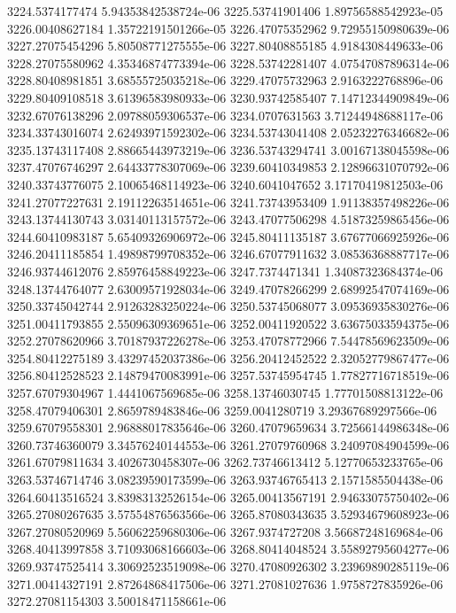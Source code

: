 {3224.5374177474 5.94353842538724e-06
3225.53741901406 1.89756588542923e-05
3226.00408627184 1.35722191501266e-05
3226.47075352962 9.72955150980639e-06
3227.27075454296 5.80508771275555e-06
3227.80408855185 4.9184308449633e-06
3228.27075580962 4.35346874773394e-06
3228.53742281407 4.07547087896314e-06
3228.80408981851 3.68555725035218e-06
3229.47075732963 2.9163222768896e-06
3229.80409108518 3.61396583980933e-06
3230.93742585407 7.14712344909849e-06
3232.67076138296 2.09788059306537e-06
3234.0707631563 3.71244948688117e-06
3234.33743016074 2.62493971592302e-06
3234.53743041408 2.05232276346682e-06
3235.13743117408 2.88665443973219e-06
3236.53743294741 3.00167138045598e-06
3237.47076746297 2.64433778307069e-06
3239.60410349853 2.12896631070792e-06
3240.33743776075 2.10065468114923e-06
3240.6041047652 3.17170419812503e-06
3241.27077227631 2.19112263514651e-06
3241.73743953409 1.91138357498226e-06
3243.13744130743 3.03140113157572e-06
3243.47077506298 4.51873259865456e-06
3244.60410983187 5.65409326906972e-06
3245.80411135187 3.67677066925926e-06
3246.20411185854 1.49898799708352e-06
3246.67077911632 3.08536368887717e-06
3246.93744612076 2.85976458849223e-06
3247.7374471341 1.34087323684374e-06
3248.13744764077 2.63009571928034e-06
3249.47078266299 2.68992547074169e-06
3250.33745042744 2.91263283250224e-06
3250.53745068077 3.09536935830276e-06
3251.00411793855 2.55096309369651e-06
3252.00411920522 3.63675033594375e-06
3252.27078620966 3.70187937226278e-06
3253.47078772966 7.54478569623509e-06
3254.80412275189 3.43297452037386e-06
3256.20412452522 2.32052779867477e-06
3256.80412528523 2.14879470083991e-06
3257.53745954745 1.77827716718519e-06
3257.67079304967 1.4441067569685e-06
3258.13746030745 1.77701508813122e-06
3258.47079406301 2.8659789483846e-06
3259.0041280719 3.29367689297566e-06
3259.67079558301 2.96888017835646e-06
3260.47079659634 3.72566144986348e-06
3260.73746360079 3.34576240144553e-06
3261.27079760968 3.24097084904599e-06
3261.67079811634 3.4026730458307e-06
3262.73746613412 5.12770653233765e-06
3263.53746714746 3.08239590173599e-06
3263.93746765413 2.1571585504438e-06
3264.60413516524 3.83983132526154e-06
3265.00413567191 2.94633075750402e-06
3265.27080267635 3.57554876563566e-06
3265.87080343635 3.52934679608923e-06
3267.27080520969 5.56062259680306e-06
3267.9374727208 3.56687248169684e-06
3268.40413997858 3.71093068166603e-06
3268.80414048524 3.55892795604277e-06
3269.93747525414 3.30692523519098e-06
3270.47080926302 3.23969890285119e-06
3271.00414327191 2.87264868417506e-06
3271.27081027636 1.9758727835926e-06
3272.27081154303 3.50018471158661e-06
}
